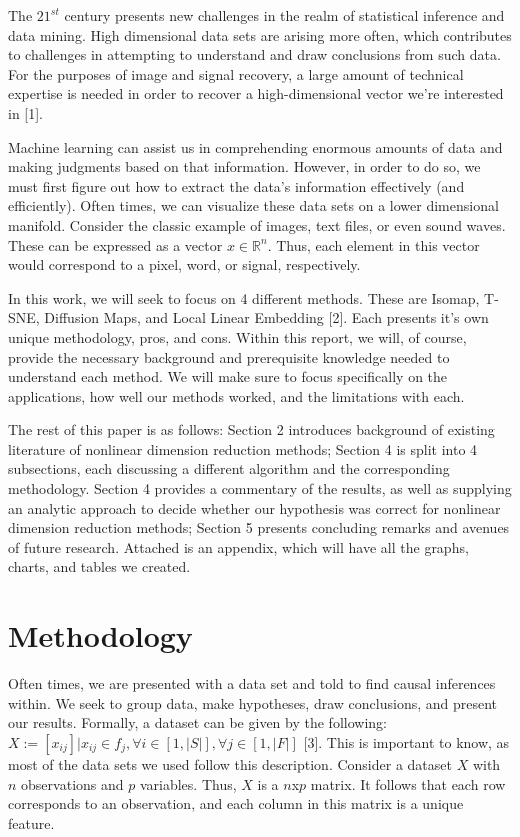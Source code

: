 \documentclass[12pt]{article}
\begin{document}
\hspace{5mm}The $21^{st}$ century presents new challenges in the realm of statistical inference and data mining. High dimensional data sets are arising more often, which contributes to challenges in attempting to understand and draw conclusions from such data. For the purposes of image and signal recovery, a large amount of technical expertise is needed in order to recover a high-dimensional vector we're interested in [1].

Machine learning can assist us in comprehending enormous amounts of data and making judgments based on that information. However, in order to do so, we must first figure out how to extract the data's information effectively (and efficiently). Often times, we can visualize these data sets on a lower dimensional manifold. Consider the classic example of images, text files, or even sound waves. These can be expressed as a vector $x\in\mathbb{R}^n$. Thus, each element in this vector would correspond to a pixel, word, or signal, respectively.

In this work, we will seek to focus on 4 different methods. These are Isomap, T-SNE, Diffusion Maps, and Local Linear Embedding [2]. Each presents it's own unique methodology, pros, and cons. Within this report, we will, of course, provide the necessary background and prerequisite knowledge needed to understand each method. We will make sure to focus specifically on the applications, how well our methods worked, and the limitations with each. 

The rest of this paper is as follows: Section 2 introduces background of existing literature of nonlinear dimension reduction methods; Section 4 is split into 4 subsections, each discussing a different algorithm and the corresponding methodology. Section 4 provides a commentary of the results, as well as supplying an analytic approach to decide whether our hypothesis was correct for nonlinear dimension reduction methods; Section 5 presents concluding remarks and avenues of future research. Attached is an appendix, which will have all the graphs, charts, and tables we created.


\section{Methodology} \label{sec:methodology}

\hspace{5mm}Often times, we are presented with a data set and told to find causal inferences within. We seek to group data, make hypotheses, draw conclusions, and present our results. Formally, a dataset can be given by the following: $X:=[x_{ij}]|x_{ij}\in f_j,\forall i\in[1,|S|],\forall j\in[1,|F|]$ [3]. This is important to know, as most of the data sets we used follow this description. Consider a dataset $X$ with $n$ observations and $p$ variables. Thus, $X$ is a $n$x$p$ matrix. It follows that each row corresponds to an observation, and each column in this matrix is a unique feature. 
\end{document}
